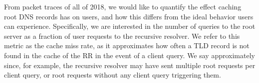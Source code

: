 \documentclass[sigconf,nonacm,10pt]{acmart}
\begin{document}
\label{sec:rr_close_look_discussion} From packet traces of all of 2018,
we would like to quantify the effect caching root DNS records has on
users, and how this differs from the ideal behavior users can
experience. Specifically, we are interested in the number of queries to
the root server as a fraction of user requests to the recursive
resolver. We refer to this metric as the cache miss rate, as it
approximates how often a TLD record is not found in the cache of the RR
in the event of a client query. We say approximately since, for example,
the recursive resolver may have sent multiple root requests per client
query, or root requests without any client query triggering them.

\begin{table}[]
\centering
{}
\end{table}
\end{document}
